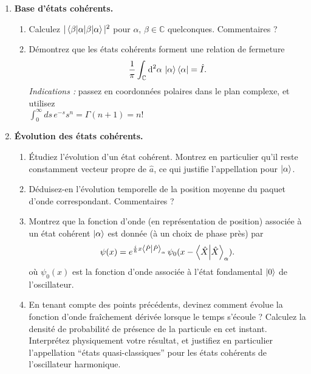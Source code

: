 \begin{enumerate}
\item \textbf{Base d'états cohérents.} 
\begin{enumerate}
\item Calculez $|\braket{\beta|\alpha}|^2$ pour $\alpha$, $\beta \in\mathbb{C}$ quelconques. Commentaires ?
\item Démontrez que les états cohérents forment une relation de fermeture
\begin{equation}
\frac{1}{\pi} \int_{\mathbb{C}} \text{d}^2\alpha \, \ket{\alpha}\bra{\alpha} = \hat I.
\end{equation}
\textit{Indications :} passez en coordonnées polaires dans le plan complexe, et utilisez \\ $\int_0^\infty ds \, e^{-s} s^n = \Gamma(n+1) = n!$
\end{enumerate}

\item \textbf{Évolution des états cohérents.} 
\begin{enumerate}
\item Étudiez l'évolution d'un état cohérent. Montrez en particulier qu'il reste constamment vecteur propre de $\hat a$, ce qui justifie l'appellation pour $\ket{\alpha}$.
\item Déduisez-en l'évolution temporelle de la position moyenne du paquet d'onde correspondant. Commentaires ?
\item Montrez que la fonction d'onde (en représentation de position) associée à un état cohérent $\ket{\alpha}$ est donnée (à un choix de phase près) par
\begin{equation}
\psi(x) = e^{\frac{i}{\hbar} x \braket{\hat P}_\alpha} \, \psi_0 (x - \braket{\hat X}_\alpha).
\end{equation}
où $\psi_0(x)$ est la fonction d'onde associée à l'état fondamental $\ket{0}$ de l'oscillateur. 
\item En tenant compte des points précédents, devinez comment évolue la fonction d'onde fraîchement dérivée lorsque le temps s'écoule ? Calculez la densité de probabilité de présence de la particule en cet instant. Interprétez physiquement votre résultat, et justifiez en particulier l'appellation ``états quasi-classiques'' pour les états cohérents de l'oscillateur harmonique.
\end{enumerate}

\end{enumerate}

